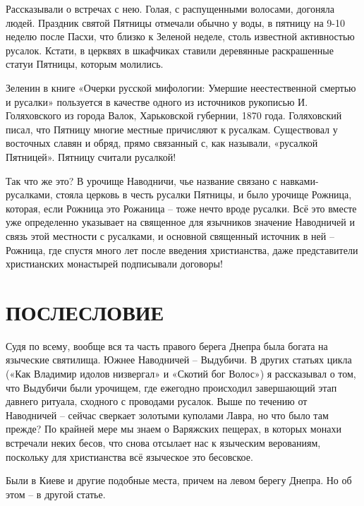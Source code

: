 \documentclass[a5paper,11pt,openany]{article}
\begin{document}
   Рассказывали о встречах с нею. Голая, с распущенными волосами, догоняла людей. Праздник святой Пятницы отмечали обычно у воды, в пятницу на 9-10 неделю после Пасхи, что близко к Зеленой неделе, столь известной активностью русалок. Кстати, в церквях в шкафчиках ставили деревянные раскрашенные статуи Пятницы, которым молились.

   Зеленин в книге «Очерки русской мифологии: Умершие неестественной смертью и русалки»\cite{zeleninrusalki} пользуется в качестве одного из источников рукописью И. Голяховского из города Валок, Харьковской губернии, 1870 года. Голяховский писал, что Пятницу многие местные причисляют к русалкам. Существовал у восточных славян и обряд, прямо связанный с, как называли, «русалкой Пятницей». Пятницу считали русалкой!

   Так что же это? В урочище Наводничи, чье название связано с навками-русалками, стояла церковь в честь русалки Пятницы, и было урочище Рожница, которая, если Рожница это Рожаница – тоже нечто вроде русалки. Всё это вместе уже определенно указывает на священное для язычников значение Наводничей и связь этой местности с русалками, и основной священный источник в ней – Рожница, где спустя много лет после введения христианства, даже представители христианских монастырей подписывали договоры!

\section{ПОСЛЕСЛОВИЕ}

Судя по всему, вообще вся та часть правого берега Днепра была богата на языческие святилища. Южнее Наводничей – Выдубичи. В других статьях цикла («Как Владимир идолов низвергал»\cite{kak} и «Скотий бог Волос»\cite{volos}) я рассказывал о том, что Выдубичи были урочищем, где ежегодно происходил завершающий этап давнего ритуала, сходного с проводами русалок. Выше по течению от Наводничей – сейчас сверкает золотыми куполами Лавра, но что было там прежде? По крайней мере мы знаем о Варяжских пещерах, в которых монахи встречали неких бесов, что снова отсылает нас к языческим верованиям, поскольку для христианства всё языческое это бесовское.

   Были в Киеве и другие подобные места, причем на левом берегу Днепра. Но об этом – в другой статье.


\newpage




%

\begin{thebibliography}{999}

\end{thebibliography}
\end{document}
